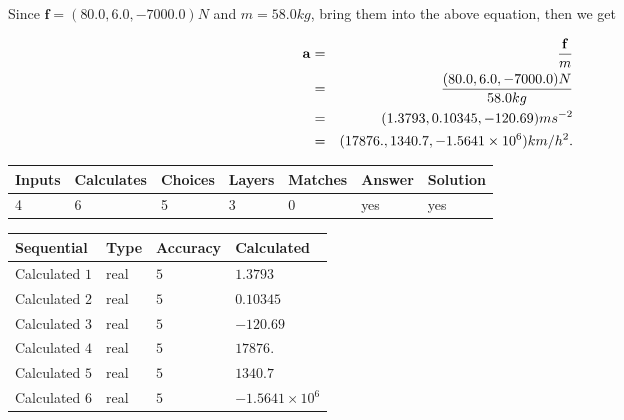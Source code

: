 \documentclass[12pt]{article}
\begin{document}
Since $\mathbf{f}=( %
80.0,  %
6.0,  %
-7000.0 )N$
and $m= %
58.0kg$, bring them into the above equation, then we get
 
\begin{eqnarray*}
\mathbf{a}&=&\frac{\mathbf{f}}m  \\
&=&\frac{(
80.0 ,
6.0 ,
-7000.0 )N
}{ %
58.0 kg}  \\
&=&(
1.3793 ,
0.10345,
-120.69
)ms^{-2} \\
&=&(
17876. ,
1340.7 ,
-1.5641 \times 10^{6}
)km/h^2.
\end{eqnarray*}
 
 
 
\noindent{}
 
 

 
\vspace{0.3in}
   
   
   
   
\noindent\begin{tabular}{|l|l|l|l|l|l|l|}
 \hline
Inputs & Calculates & Choices & Layers & Matches & Answer & Solution \\ \hline
           4  & 
           6  & 
           5
  & 
           3  & 
           0  & 
  yes & 
  yes 
  \\ \hline
 \end{tabular}
   
   
   
   
\noindent{}
   
   
  
  
\noindent\begin{tabular}{|l|l|l|l|}
\hline
 Sequential & Type & Accuracy & Calculated \\ 
\hline
 
 
  Calculated $            1 $ & real & $            5  $ & 
 $ 1.3793 $ 
 \\  \hline  
 
 
  Calculated $            2 $ & real & $            5  $ & 
 $ 0.10345 $ 
 \\  \hline  
 
 
  Calculated $            3 $ & real & $            5  $ & 
 $ -120.69 $ 
 \\  \hline  
 
 
  Calculated $            4 $ & real & $            5  $ & 
 $ 17876. $ 
 \\  \hline  
 
 
  Calculated $            5 $ & real & $            5  $ & 
 $ 1340.7 $ 
 \\  \hline  
 
 
  Calculated $            6 $ & real & $            5  $ & 
 $ -1.5641 \times 10^{6} $ 
 \\  \hline  
 \end{tabular}
   
\end{document}
